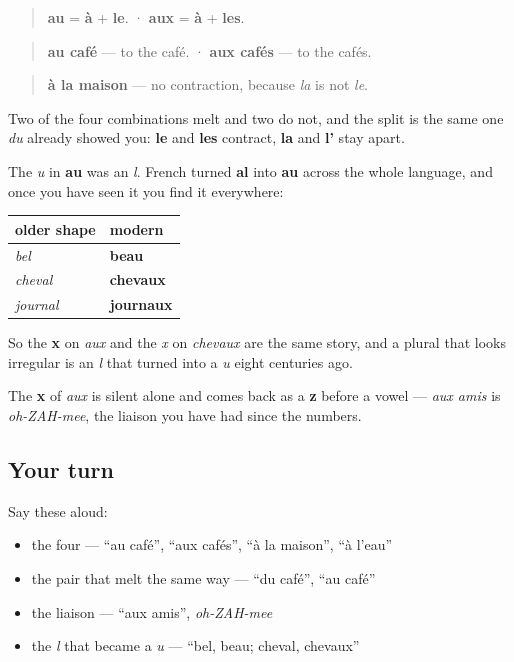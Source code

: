 \begin{cousinweb}
\begin{quote}
\textbf{au} = \textbf{à} + \textbf{le}. · \textbf{aux} = \textbf{à} + \textbf{les}.
\end{quote}

\begin{quote}
\textbf{au café} — to the café. · \textbf{aux cafés} — to the cafés.
\end{quote}

\begin{quote}
\textbf{à la maison} — no contraction, because \emph{la} is not \emph{le}.
\end{quote}

Two of the four combinations melt and two do not, and the split is the same one \emph{du} already showed you: \textbf{le} and \textbf{les} contract, \textbf{la} and \textbf{l'} stay apart.

The \emph{u} in \textbf{au} was an \emph{l}. French turned \textbf{al} into \textbf{au} across the whole language, and once you have seen it you find it everywhere:

\noindent
\begin{tabularx}{\linewidth}{@{}>{\raggedright\arraybackslash}X>{\raggedright\arraybackslash}X@{}}
\toprule
\textbf{older shape} & \textbf{modern} \\
\midrule
\emph{bel} & \textbf{beau} \\
\emph{cheval} & \textbf{chevaux} \\
\emph{journal} & \textbf{journaux} \\
\bottomrule
\end{tabularx}

So the \textbf{x} on \emph{aux} and the \emph{x} on \emph{chevaux} are the same story, and a plural that looks irregular is an \emph{l} that turned into a \emph{u} eight centuries ago.

The \textbf{x} of \emph{aux} is silent alone and comes back as a \textbf{z} before a vowel — \emph{aux amis} is \emph{oh-ZAH-mee}, the liaison you have had since the numbers.
\end{cousinweb}

\subsection*{Your turn}
Say these aloud:

\begin{itemize}
\raggedright
  \item the four — \textquotedblleft{}au café\textquotedblright{}, \textquotedblleft{}aux cafés\textquotedblright{}, \textquotedblleft{}à la maison\textquotedblright{}, \textquotedblleft{}à l'eau\textquotedblright{}
  \item the pair that melt the same way — \textquotedblleft{}du café\textquotedblright{}, \textquotedblleft{}au café\textquotedblright{}
  \item the liaison — \textquotedblleft{}aux amis\textquotedblright{}, \emph{oh-ZAH-mee}
  \item the \emph{l} that became a \emph{u} — \textquotedblleft{}bel, beau; cheval, chevaux\textquotedblright{}
\end{itemize}

